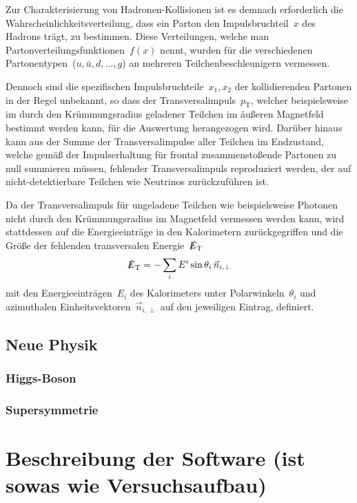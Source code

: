\documentclass[11pt, a4paper]{article}
\numberwithin{equation}{section}
\begin{document}
Zur Charakterisierung von Hadronen-Kollisionen ist es demnach erforderlich die Wahrscheinlichkeitsverteilung, dass ein Parton den Impulsbruchteil~$x$ des Hadrons trägt, zu bestimmen.
Diese Verteilungen, welche man Partonverteilungsfunktionen~$f(x)$ nennt, wurden für die verschiedenen Partonentypen~($u, \bar{u}, d, \dots, g$) an mehreren Teilchenbeschleunigern vermessen.

Dennoch sind die spezifischen Impulsbruchteile~$x_1, x_2$ der kollidierenden Partonen in der Regel unbekannt, so dass der Transversalimpuls~$p_\mathrm{T}$, welcher beispielsweise im durch den Krümmungsradius geladener Teilchen im äußeren Magnetfeld bestimmt werden kann, für die Auswertung herangezogen wird.
Darüber hinaus kann aus der Summe der Transversalimpulse aller Teilchen im Endzustand, welche gemäß der Impulserhaltung für frontal zusammenstoßende Partonen zu null summieren müssen, fehlender Transversalimpuls reproduziert werden, der auf nicht-detektierbare Teilchen wie Neutrinos zurückzuführen ist.

Da der Transversalimpuls für ungeladene Teilchen wie beispielsweise Photonen nicht durch den Krümmungsradius im Magnetfeld vermessen werden kann, wird stattdessen auf die Energieeinträge in den Kalorimetern zurückgegriffen und die Größe der fehlenden transversalen Energie~$\slashed{E}_\mathrm{T}$
\begin{align*}
	\slashed{E}_\mathrm{T} = - \sum_{i} E^i \sin\theta_i \, \vec{n}_{i,\perp}
\end{align*}
mit den Energieeinträgen~$E_i$ des Kalorimeters unter Polarwinkeln~$\theta_i$  und azimuthalen Einheitsvektoren~$\vec{n}_{i,\perp}$ auf den jeweiligen Eintrag, definiert.



\subsection{Neue Physik}

\subsubsection{Higgs-Boson}

\subsubsection{Supersymmetrie}


\section{Beschreibung der Software (ist sowas wie Versuchsaufbau)}
\end{document}
